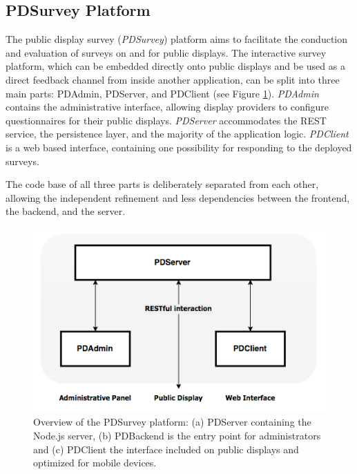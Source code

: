 

\subsection{PDSurvey Platform}

	The public display survey (\textit{PDSurvey}) platform aims to facilitate the conduction and evaluation of surveys on and for public displays. 
	The interactive survey platform, which can be embedded directly onto public displays and be used as a direct feedback channel from inside another application, can be split into three main parts: PDAdmin, PDServer, and PDClient (see Figure \ref{fig:4-pdsurvey-platform}). \textit{PDAdmin} contains the administrative interface, allowing display providers to configure questionnaires for their public displays. \textit{PDServer} accommodates the REST service, the persistence layer, and the majority of the application logic. \textit{PDClient} is a web based interface, containing one possibility for responding to the deployed surveys. 

	The code base of all three parts is deliberately separated from each other, allowing the independent refinement and less dependencies between the frontend, the backend, and the server.




	\begin{figure}%
	    \begin{center}
	        \includegraphics[width=.7\columnwidth]{img/4_implementation/4-overview}
	    \end{center}
	 \caption[Overview of the PDSurvey platform]{Overview of the PDSurvey platform: (a) PDServer containing the Node.js server, (b) PDBackend is the entry point for administrators and (c) PDClient the interface included on public displays and optimized for mobile devices.}
	 \label{fig:4-pdsurvey-platform}
	\end{figure}




